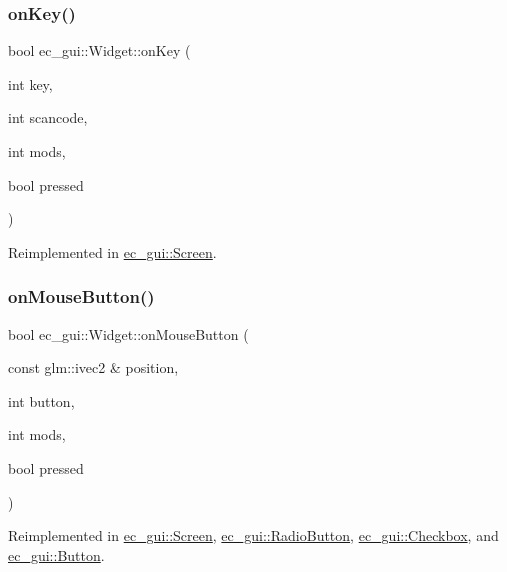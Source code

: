 \subsubsection{\texorpdfstring{on\+Key()}{onKey()}}
{\footnotesize\ttfamily bool ec\+\_\+gui\+::\+Widget\+::on\+Key (\begin{DoxyParamCaption}\item[{int}]{key,  }\item[{int}]{scancode,  }\item[{int}]{mods,  }\item[{bool}]{pressed }\end{DoxyParamCaption})\hspace{0.3cm}{\ttfamily [virtual]}}



Reimplemented in \mbox{\hyperlink{classec__gui_1_1_screen_a3eda49d97cc53349466a96d9549520f8}{ec\+\_\+gui\+::\+Screen}}.

\mbox{\label{classec__gui_1_1_widget_a824efc45fa4df40d7e1e94f08e6363cf}} 
\subsubsection{\texorpdfstring{on\+Mouse\+Button()}{onMouseButton()}}
{\footnotesize\ttfamily bool ec\+\_\+gui\+::\+Widget\+::on\+Mouse\+Button (\begin{DoxyParamCaption}\item[{const glm\+::ivec2 \&}]{position,  }\item[{int}]{button,  }\item[{int}]{mods,  }\item[{bool}]{pressed }\end{DoxyParamCaption})\hspace{0.3cm}{\ttfamily [virtual]}}



Reimplemented in \mbox{\hyperlink{classec__gui_1_1_screen_a52e91a7c1d03514256956b72860f52ff}{ec\+\_\+gui\+::\+Screen}}, \mbox{\hyperlink{classec__gui_1_1_radio_button_a1292737d957e5cd5ff445bb43ea6911c}{ec\+\_\+gui\+::\+Radio\+Button}}, \mbox{\hyperlink{classec__gui_1_1_checkbox_a2c9a4610ead12fd4cb8cb7e4fe38f169}{ec\+\_\+gui\+::\+Checkbox}}, and \mbox{\hyperlink{classec__gui_1_1_button_aee51b738c759beadb9de9734ca1bde08}{ec\+\_\+gui\+::\+Button}}.

